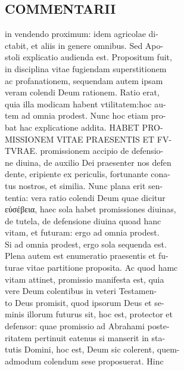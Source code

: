 \documentclass{article}
\begin{document}
\begin{pages}
\section*{COMMENTARII \\
                }in vendendo proximum: idem agricolae di- \\
                ctabit, et aliis in genere omnibus. Sed Apo- \\
                stoli explicatio audienda est. Propositum fuit, \\
                in disciplina vitae fugiendam superstitionem \\
                ac profanationem, sequendam autem ipsam \\
                veram colendi Deum rationem. Ratio erat, \\
                quia illa modicam habent vtilitatem:hoc au- \\
                tem ad omnia prodest. Nunc hoc etiam pro- \\
                bat hac explicatione addita. HABET PRO- \\
                MISSIONEM VITAE PRAESENTIS ET FV- \\
                TVRAE. promissionem accipio de defensio- \\
                ne diuina, de auxilio Dei praesenter nos defen \\
                dente, eripiente ex periculis, fortunante cona- \\
                tus nostros, et similia. Nunc plana erit sen- \\
                tentia: vera ratio colendi Deum quae dicitur \\
                εὐσέβεια, haec sola habet promissiones diuinas, \\
                de tutela, de defensione diuina quoad hanc \\
                vitam, et futuram: ergo ad omnia prodest. \\
                Si ad omnia prodest, ergo sola sequenda est. \\
                Plena autem est enumeratio praesentis et fu- \\
                turae vitae partitione proposita. Ac quod hamc \\
                vitam attinet, promissio manifesta est, quia \\
                vere Deum colentibus in veteri Testamen- \\
                to Deus promisit, quod ipsorum Deus et se- \\
                minis illorum futurus sit, hoc est, protector et \\
                defensor: quae promissio ad Abrahami poste- \\
                ritatem pertinuit eatenus si manserit in sta- \\
                tutis Domini, hoc est, Deum sic colerent, quem- \\
                admodum colendum sese proposuerat. Hinc \\
                

\end{pages}
\end{document}
